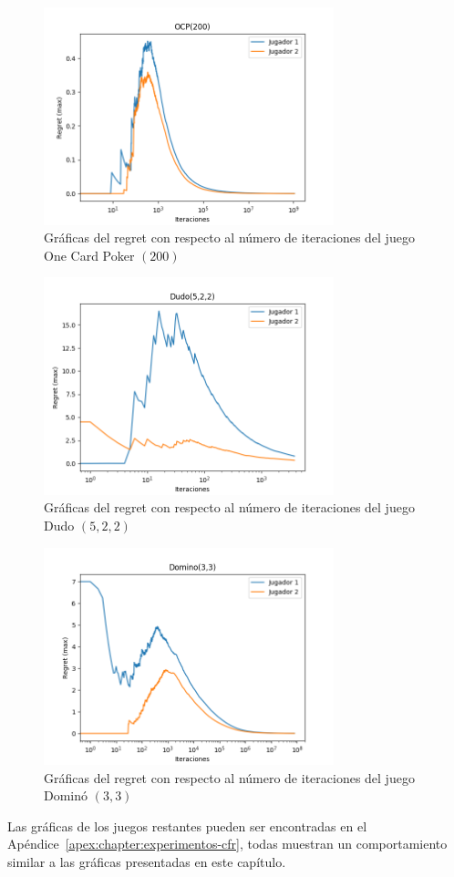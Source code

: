 \begin{figure}
    \caption{Gráficas del regret con respecto al número de iteraciones del juego One Card Poker $(200)$}
    \label{fig:cfr-regret-ocp-200}
    \centering
    \includegraphics[width=0.75\textwidth]{graficas/cfr/ocp/OCP(200).png}
\end{figure}

\begin{figure}
    \caption{Gráficas del regret con respecto al número de iteraciones del juego Dudo $(5, 2, 2)$}
    \label{fig:cfr-regret-dudo-5-2-2}
    \centering
    \includegraphics[width=0.75\textwidth]{graficas/cfr/dudo/Dudo(5,2,2).png}
\end{figure}

\begin{figure}
    \caption{Gráficas del regret con respecto al número de iteraciones del juego Dominó $(3, 3)$}
    \label{fig:cfr-regret-domino-3-3}
    \centering
    \includegraphics[width=0.75\textwidth]{graficas/cfr/domino/Domino(3,3).png}
\end{figure}

Las gráficas de los juegos restantes pueden ser encontradas en el Apéndice~\ref{apex:chapter:experimentos-cfr}, todas muestran un comportamiento similar a las gráficas presentadas en este capítulo.

